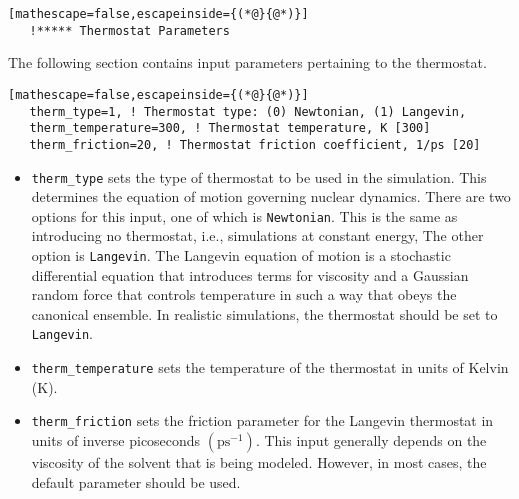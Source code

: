 \begin{lstlisting}[mathescape=false,escapeinside={(*@}{@*)}]
   !***** Thermostat Parameters
\end{lstlisting}
The following section contains input parameters pertaining to the thermostat.
\begin{lstlisting}[mathescape=false,escapeinside={(*@}{@*)}]
   therm_type=1, ! Thermostat type: (0) Newtonian, (1) Langevin, 
   therm_temperature=300, ! Thermostat temperature, K [300]
   therm_friction=20, ! Thermostat friction coefficient, 1/ps [20]
\end{lstlisting}
\begin{itemize}
\item \verb+therm_type+ sets the type of thermostat to be used in the simulation.  This determines the equation of motion governing nuclear dynamics.  There are two options for this input, one of which is \verb+Newtonian+.  This is the same as introducing no thermostat, i.e., simulations at constant energy, The other option is \verb+Langevin+.  The Langevin equation of motion is a stochastic differential equation that introduces terms for viscosity and a Gaussian random force that controls temperature in such a way that obeys the canonical ensemble.  In realistic simulations, the thermostat should be set to \verb+Langevin+.
\item \verb+therm_temperature+ sets the temperature of the thermostat in units of Kelvin (K).
\item \verb+therm_friction+ sets the friction parameter for the Langevin thermostat in units of inverse picoseconds $\left(\text{ps}^{-1}\right)$.  This input generally depends on the viscosity of the solvent that is being modeled. However, in most cases, the default parameter should be used.
\end{itemize}

